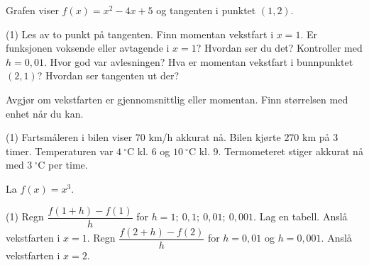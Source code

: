 Grafen viser $f(x) = x^2 - 4x + 5$ og tangenten i punktet $(1, 2)$.\par
\begin{minipage}[t]{0.55\linewidth}
\vspace{0pt}
\begin{tasks}(1)
  \task Les av to punkt på tangenten. Finn momentan vekstfart i $x = 1$.
  \task Er funksjonen voksende eller avtagende i $x = 1$? Hvordan ser du det?
  \task Kontroller med $h = 0,01$. Hvor god var avlesningen?
  \task Hva er momentan vekstfart i bunnpunktet $(2, 1)$? Hvordan ser tangenten ut der?
\end{tasks}
\end{minipage}\hfill
\begin{minipage}[t]{0.42\linewidth}
\vspace{0pt}\centering
{}
\end{minipage}

Avgjør om vekstfarten er gjennomsnittlig eller momentan. Finn størrelsen med enhet når du kan.
\begin{tasks}(1)
  \task Fartsmåleren i bilen viser $70$ km/h akkurat nå.
  \task Bilen kjørte $270$ km på $3$ timer.
  \task Temperaturen var $4\ {}^\circ$C kl. 6 og $10\ {}^\circ$C kl. 9.
  \task Termometeret stiger akkurat nå med $3\ {}^\circ$C per time.
\end{tasks}


La $f(x) = x^3$.
\begin{tasks}(1)
  \task Regn $\dfrac{f(1 + h) - f(1)}{h}$ for $h = 1;\ 0,1;\ 0,01;\ 0,001$. Lag en tabell.
  \task Anslå vekstfarten i $x = 1$.
  \task Regn $\dfrac{f(2 + h) - f(2)}{h}$ for $h = 0,01$ og $h = 0,001$. Anslå vekstfarten i $x = 2$.
\end{tasks}


